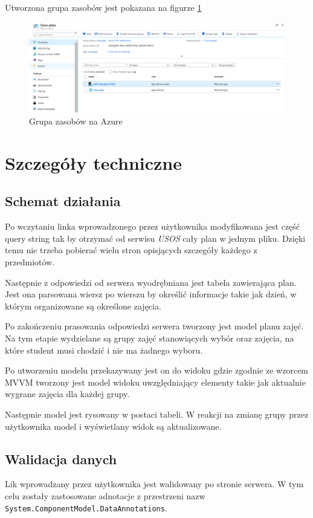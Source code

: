 \documentclass{mwart}
\begin{document}
Utworzona grupa zasobów jest pokazana na figurze \ref{fig:resourceGroup}

\begin{figure}[h]
    \centering
    \includegraphics[width=13cm]{resource_group.png}
    \caption{Grupa zasobów na Azure}
    \label{fig:resourceGroup}
\end{figure}

\section{Szczegóły techniczne}

\subsection{Schemat działania}
Po wczytaniu linka wprowadzonego przez użytkownika modyfikowana jest część query string tak by otrzymać od serwisu \textit{USOS} cały plan w jednym pliku. Dzięki temu nie trzeba pobierać wielu stron opisjących szczegóły każdego z przedmiotów.

Następnie z odpowiedzi od serwera wyodrębniana jest tabela zawierająca plan. Jest ona parsowana wiersz po wierszu by określić informacje takie jak dzień, w którym organizowane są określone zajęcia. 

Po zakończeniu prasowania odpowiedzi serwera tworzony jest model planu zajęć. Na tym etapie wydzielane są grupy zajęć stanowiących wybór oraz zajęcia, na które student musi chodzić i nie ma żadnego wyboru.

Po utworzeniu modelu przekazywany jest on do widoku gdzie zgodnie ze wzorcem MVVM tworzony jest model widoku uwzględniający elementy takie jak aktualnie wygrane zajęcia dla każdej grupy.

Następnie model jest rysowany w postaci tabeli. W reakcji na zmianę grupy przez użytkownika model i wyświetlany widok są aktualizowane.

\subsection{Walidacja danych}
Lik wprowadzany przez użytkownika jest walidowany po stronie serwera. W tym celu zostały zastosowane adnotacje z przestrzeni nazw \texttt{System.ComponentModel.DataAnnotations}.
\end{document}
